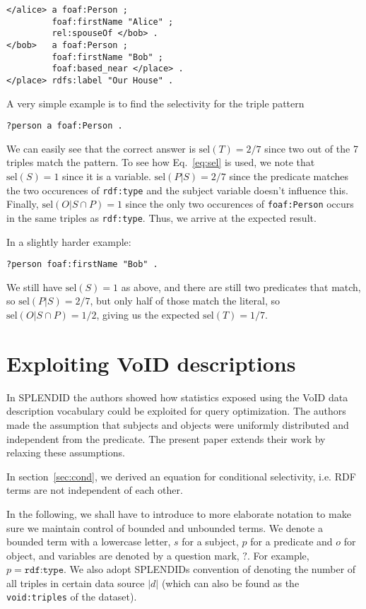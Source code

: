 \documentclass[12pt, draft]{article}
\newcommand{\rdfterm}[1]{\texttt{#1}}
\newcommand{\sel}[1]{\ensuremath{\mathrm{sel}\left(#1\right)}}
\begin{document}
\begin{verbatim}
</alice> a foaf:Person ;
         foaf:firstName "Alice" ;
         rel:spouseOf </bob> .
</bob>   a foaf:Person ;
         foaf:firstName "Bob" ;
         foaf:based_near </place> .
</place> rdfs:label "Our House" .
\end{verbatim}

A very simple example is to find the selectivity for the triple pattern
\begin{verbatim}
?person a foaf:Person .
\end{verbatim}
We can easily see that the correct answer is $\sel{T} = 2/7$ since two
out of the 7 triples match the pattern. To see how Eq.~\ref{eq:sel} is
used, we note that $\sel{S} = 1$ since it is a variable. $\sel{P | S} =
2/7$ since the predicate matches the two occurences of
\rdfterm{rdf:type} and the subject variable doesn't influence
this. Finally, $\sel{O | S \cap P} = 1$ since the only two occurences
of \rdfterm{foaf:Person} occurs in the same triples as
\rdfterm{rdf:type}. Thus, we arrive at the expected result.

In a slightly harder example:
\begin{verbatim}
?person foaf:firstName "Bob" .
\end{verbatim}
We still have $\sel{S} = 1$ as above, and there are still two
predicates that match, so $\sel{P | S} = 2/7$, but only half of those
match the literal, so $\sel{O | S \cap P} = 1/2$, giving us the
expected $\sel{T} = 1/7$.

\section{Exploiting VoID descriptions}

In SPLENDID\cite{splendid} the authors showed how statistics exposed
using the VoID data description vocabulary\cite{void} could be
exploited for query optimization. The authors made the assumption that
subjects and objects were uniformly distributed and independent from
the predicate. The present paper extends their work by relaxing these
assumptions.

In section~\ref{sec:cond}, we derived an equation for conditional
selectivity, i.e. RDF terms are not independent of each
other.
 
In the following, we shall have to introduce to more elaborate
notation to make sure we maintain control of bounded and unbounded
terms. We denote a bounded term with a lowercase letter, $s$
for a subject, $p$ for a predicate and $o$ for object, and variables
are denoted by a question mark, $?$. For example, $p =
\rdfterm{rdf:type}$. We also adopt SPLENDIDs convention of denoting
the number of all triples in certain data source $|d|$ (which can also
be found as the \rdfterm{void:triples} of the dataset).
\end{document}
